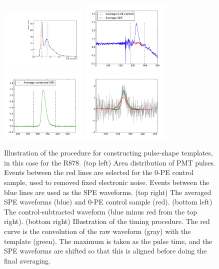 {\begin{figure}[t!]
  \begin{center}
    \includegraphics[width=0.375\textwidth]{figs/milliq/pulse_area.pdf}
    \includegraphics[width=0.375\textwidth]{figs/milliq/avg_spe_control.pdf} \\
    \includegraphics[width=0.375\textwidth]{figs/milliq/avg_spe_fixed.pdf}
    \includegraphics[width=0.375\textwidth]{figs/milliq/samp_smoothed.pdf}
    \caption{Illustration of the procedure for constructing pulse-shape templates,
      in this case for the R878.
      (top left) Area distribution of PMT pulses. Events between the red lines
      are selected for the 0-PE control sample, used to removed fixed electronic noise.
      Events between the blue lines are used as the SPE waveforms.
      (top right) The averaged SPE waveforms (blue) and 0-PE control sample (red).
      (bottom left) The control-subtracted waveform (blue minus red from the top right).
      (bottom right) Illustration of the timing procedure. The red curve is the convolution
      of the raw waveform (gray) with the template (green). The maximum is taken as the pulse time,
      and the SPE waveforms are shifted so that this is aligned before doing the final averaging.
            }
    \label{fig:pulse_shape_proc}
  \end{center}
\end{figure}

}
